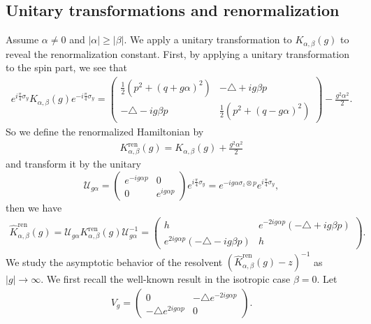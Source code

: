 \documentclass[12pt,dvipdfmx]{article}
\begin{document}
\subsection{Unitary transformations and renormalization}
%
%
Assume $\alpha\ne0$ and $|\alpha|\ge|\beta|$. We apply a unitary transformation to $K_{\alpha,\beta}(g)$ to reveal the renormalization constant. First, by applying a unitary transformation to the spin part, we see that
\begin{align*}
    e^{i\frac{\pi}{4}\sigma_y} K_{\alpha,\beta}(g) e^{-i\frac{\pi}{4}\sigma_y}
    = 
    \begin{pmatrix}
        \frac12 (p^2 + (q + g\alpha)^2) & -\triangle + ig\beta p\\
        -\triangle - ig\beta p & \frac12 (p^2 + (q - g\alpha)^2)
    \end{pmatrix} 
    - \frac{g^2\alpha^2}{2}.
\end{align*}
So we define the renormalized Hamiltonian by 
\begin{align*}
    K^\mathrm{ren} _{\alpha,\beta}(g) = K_{\alpha,\beta}(g) + \frac{g^2\alpha^2}{2}
\end{align*}
and transform it by the unitary
\[
    \mathcal{U} _{g\alpha} 
    = 
    \begin{pmatrix} e^{-ig\alpha p} & 0\\ 0 & e^{ig\alpha p} \end{pmatrix}
    e^{i\frac{\pi}{4}\sigma_y}
    = 
    e^{-ig\alpha \sigma_z \otimes p} e^{i\frac{\pi}{4}\sigma_y},\]
then we have
\begin{align*}
    \hat{K}^{\mathrm{ren} }_{\alpha,\beta}(g)
    = 
    \mathcal{U} _{g\alpha} 
    K^\mathrm{ren} _{\alpha,\beta}(g) 
    \mathcal{U} _{g\alpha}^{-1} 
    = 
    \begin{pmatrix}
        h & e^{-2ig\alpha p} (-\triangle + ig\beta p)\\
        e^{2ig\alpha p} (-\triangle - ig\beta p) & h 
    \end{pmatrix}.
\end{align*}
%
We study the asymptotic behavior of the resolvent $(\hat{K}^{\mathrm{ren} }_{\alpha,\beta}(g) - z)^{-1}$ as $|g|\to\infty$. %
We first recall the well-known result in the isotropic case $\beta=0$. 
Let
\begin{align*}
    V_g 
    = 
    \begin{pmatrix}
        0 & -\triangle e^{-2ig\alpha p}\\
        -\triangle e^{2ig\alpha p} & 0
    \end{pmatrix}. 
\end{align*}
\end{document}
